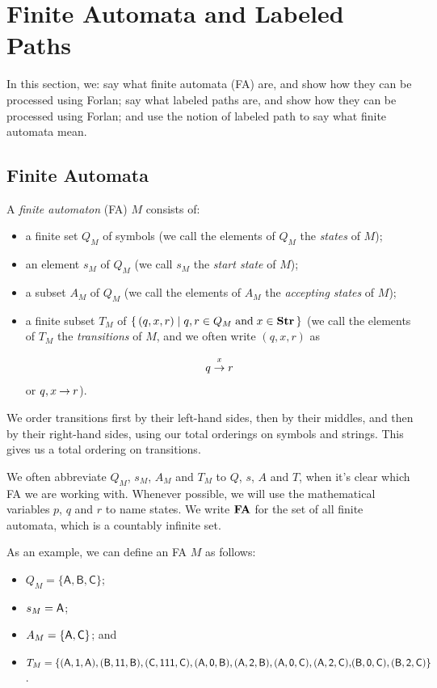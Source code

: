 \section{Finite Automata and Labeled Paths}
\label{FiniteAutomataAndLabeledPaths}


In this section, we: say what finite automata (FA) are, and show how
they can be processed using Forlan; say what labeled paths are, and
show how they can be processed using Forlan; and use the notion of
labeled path to say what finite automata mean.

\subsection{Finite Automata}

A \emph{finite automaton} (FA) $M$ consists of:
\begin{itemize}
\item a finite set $Q_M$ of symbols (we call the elements of $Q_M$
the \emph{states} of $M$);

\item an element $s_M$ of $Q_M$ (we call $s_M$ the \emph{start state}
of $M$);

\item a subset $A_M$ of $Q_M$ (we call the elements of $A_M$ the
\emph{accepting states} of $M$);

\item a finite subset $T_M$ of $\{ \, (q,x,r) \mid q,r\in Q_M\;\allowbreak\mbox{and}\allowbreak\;
x\in\mathbf{Str} \, \}$ (we call the elements of $T_M$ the \emph{transitions} of
$M$, and we often write $(q, x, r)$ as
\begin{gather*}
q\stackrel{\strut x}{\rightarrow}r
\end{gather*}
or $q,x\mathbin{\to} r$).
\end{itemize}

We order transitions first by their left-hand sides, then by their
middles, and then by their right-hand sides, using our total orderings
on symbols and strings.  This gives us a total ordering on
transitions.

We often abbreviate $Q_M$, $s_M$, $A_M$ and $T_M$ to $Q$, $s$, $A$ and
$T$, when it's clear which FA we are working with.  Whenever possible,
we will use the mathematical variables $p$, $q$ and $r$ to name
states.  We write $\mathbf{FA}$ for the set of all finite automata, which is a
%
countably infinite set.

As an example, we can define an FA $M$ as follows:
\begin{itemize}
\item $Q_M=\{\mathsf{A,B,C}\}$;

\item $s_M=\mathsf{A}$;

\item $A_M=\{\mathsf{A}, \mathsf{C}\}$; and

\item $T_M=\{\mathsf{(A,1,A), (B,11,B), (C,111,C),
  (A,0,B),(A,2,B),(A,0,C),(A,2,C),}\allowbreak\mathsf{(B,0,C), (B,2,C)}\}$.
\end{itemize}

